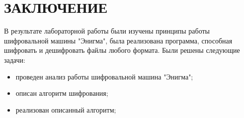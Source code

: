 \chapter*{ЗАКЛЮЧЕНИЕ}

В результате лабораторной работы были изучены принципы работы шифровальной машины "Энигма", была реализована программа, способная шифровать и дешифровать файлы любого формата.
Были решены следующие задачи:

\begin{itemize}[label=---]
	\item проведен анализ работы шифровальной машина "Энигма";
	\item описан алгоритм шифрования;
	\item реализован описанный алгоритм;
\end{itemize}